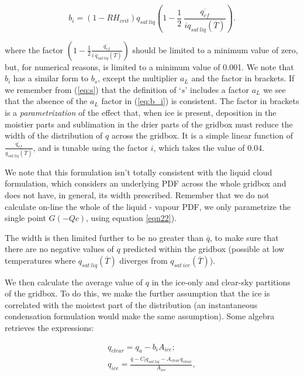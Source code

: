 \documentclass{UMDP_article}
\begin{document}
\begin{equation}
b_i = (1 - RH_{crit} ) q_{sat \, liq} ( 1 - \frac{1}{2}
~ \frac{\overline{q_{cf}}} {i q_{sat \, liq}(\overline{T})} ) .
\label{eq:b_i}
\end{equation}

where the factor $( 1 - \frac{1}{2}
\frac{\overline{q_{cf}}} {i ~ q_{sat \, liq}(\overline{T})})$ should be limited
to a minimum value of zero, but, for numerical reasons, is limited to
a minimum value of 0.001. We note that $b_i$ has a similar form to $b_s$,
except the multiplier $a_L$ and the factor in brackets. If we remember
from (\ref{eq:s}) that the definition of `$s$' includes a factor $a_L$
we see that the absence of the $a_L$ factor in (\ref{eq:b_i}) is
consistent. The factor in brackets is a \textit{parametrization} of the
effect that, when ice
is present, deposition in the moistier parts and sublimation in the
drier parts of the gridbox must reduce the width of the distribution
of $q$ across the gridbox. It is a simple linear function of
$\frac{\overline{q_{cf}}}{q_{sat~liq}(\overline{T})}$, and is tunable
using the factor $i$, which takes the value of 0.04.

We note that this formulation isn't totally consistent with the liquid
cloud formulation, which considers an underlying PDF across the whole
gridbox and does not have, in general, its width prescribed.
Remember that we do not calculate on-line the whole of the liquid
- vapour PDF, we only parametrize the single point $G(-Qc)$,
using equation \ref{eqn22}).

The width is then limited further to be no greater than $\overline{q}$,
to make sure that there are no negative values of $q$ predicted within the
gridbox (possible at low
temperatures where $q_{sat~liq}(\overline{T})$ diverges from
$q_{sat~ice}(\overline{T})$).

We then calculate the average value of $q$ in the ice-only and clear-sky
partitions of the gridbox. To do this, we make the further assumption
that the ice is correlated with the moistest part of the distribution
(an instantaneous condensation formulation would make the
same assumption). Some algebra retrieves the expressions:

\begin{eqnarray}
q_{clear} = q_a - b_i A_{ice} ; \\
q_{ice} = \frac {\overline{q} - C_l q_{sat~liq} - A_{clear} q_{clear} }
{A_{ice}},
\label{eq:q_clear_and_q_ice}
\end{eqnarray}
\end{document}
